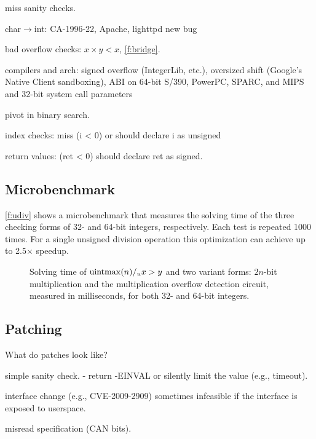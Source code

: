 miss sanity checks.

char$\to$int: 
CA-1996-22,
Apache,
lighttpd new bug

bad overflow checks: $x \times y < x$, 
\autoref{f:bridge}.

compilers and arch:
signed overflow (IntegerLib, etc.),
oversized shift (Google's Native Client sandboxing),
ABI on 64-bit S/390, PowerPC, SPARC, and MIPS
and 32-bit system call parameters~\cite[CVE-2009-0029]{cve}

pivot in binary search.

index checks:
miss (i < 0) or should declare i as unsigned

return values: (ret < 0)
should declare ret as signed.

\subsection{Microbenchmark}
\label{s:eval:micro}

\autoref{f:udiv} shows a microbenchmark that measures the solving
time of the three checking forms of 32- and 64-bit integers,
respectively.  Each test is repeated 1000 times.  For a single
unsigned division operation this optimization can achieve up to
2.5$\times$ speedup.

\begin{figure}
\centering

\caption{Solving time of $\operatorname{uintmax}(n) /_u x > y$ and two variant
forms: $2n$-bit multiplication and the multiplication overflow
detection circuit, measured in milliseconds, for both 32- and 64-bit
integers.}
\label{f:udiv}
\end{figure}

\subsection{Patching}

What do patches look like?

simple sanity check.
- return -EINVAL or silently limit the value (e.g., timeout).

interface change (e.g., CVE-2009-2909)
sometimes infeasible if the interface is exposed to userspace.

misread specification (CAN bits).


